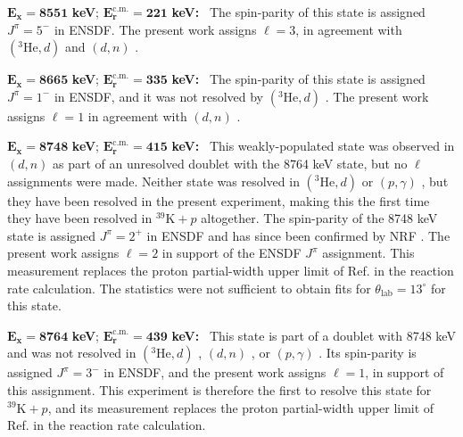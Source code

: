 \emph{$\mathbf{E_{x} = 8551}$} \textbf{keV}; \emph{$\mathbf{E^{\boldsymbol{\mathrm{c.m.}}}_{r} = 221}$} \textbf{keV:} \, 
The spin-parity of this state is assigned $J^{\pi} = 5^{-}$ in ENSDF. The present work assigns $\ell=3$, in agreement with $(^{3}\mathrm{He}, d)$ \cite{Erskine1966,Seth1967,Cage1971} and $(d, n)$ \cite{Fuchs1969}.

\emph{$\mathbf{E_{x} = 8665}$} \textbf{keV}; \emph{$\mathbf{E^{\boldsymbol{\mathrm{c.m.}}}_{r} = 335}$} \textbf{keV:} \, 
The spin-parity of this state is assigned $J^{\pi} = 1^{-}$ in ENSDF, and it was not resolved by $(^{3}\mathrm{He},d)$ \cite{Erskine1966,Seth1967,Cage1971}. The present work assigns $\ell=1$ in agreement with $(d, n)$ \cite{Fuchs1969}.

\emph{$\mathbf{E_{x} = 8748}$} \textbf{keV}; \emph{$\mathbf{E^{\boldsymbol{\mathrm{c.m.}}}_{r} = 415}$} \textbf{keV:} \, 
This weakly-populated state was observed in $(d, n)$ \cite{Fuchs1969} as part of an unresolved doublet with the 8764 keV state, but no $\ell$ assignments were made. Neither state was resolved in $(^{3}\mathrm{He},d)$ \cite{Erskine1966,Seth1967,Cage1971} or $(p,\gamma)$ \cite{Kikstra1990,Cheng1981,Leenhouts1966}, but they have been resolved in the present experiment, making this the first time they have been resolved in $^{39}\mathrm{K}+p$ altogether. The spin-parity of the 8748 keV state is assigned $J^{\pi} = 2^{+}$ in ENSDF and has since been confirmed by NRF \cite{Gribble2022}. The present work assigns $\ell=2$ in support of the ENSDF $J^{\pi}$ assignment. This measurement replaces the proton partial-width upper limit of Ref. \cite{Longland2018} in the reaction rate calculation. The statistics were not sufficient to obtain fits for $\theta_{\mathrm{lab}} = 13^{\circ}$ for this state.

\emph{$\mathbf{E_{x} = 8764}$} \textbf{keV}; \emph{$\mathbf{E^{\boldsymbol{\mathrm{c.m.}}}_{r} = 439}$} \textbf{keV:} \, 
This state is part of a doublet with 8748 keV and was not resolved in $(^{3}\mathrm{He},d)$ \cite{Erskine1966,Seth1967,Cage1971}, $(d, n)$ \cite{Fuchs1969}, or $(p,\gamma)$ \cite{Kikstra1990,Cheng1981,Leenhouts1966}. Its spin-parity is assigned $J^{\pi} = 3^{-}$ in ENSDF, and the present work assigns $\ell=1$, in support of this assignment. This experiment is therefore the first to resolve this state for $^{39}\mathrm{K}+p$, and its measurement replaces the proton partial-width upper limit of Ref. \cite{Longland2018} in the reaction rate calculation.


